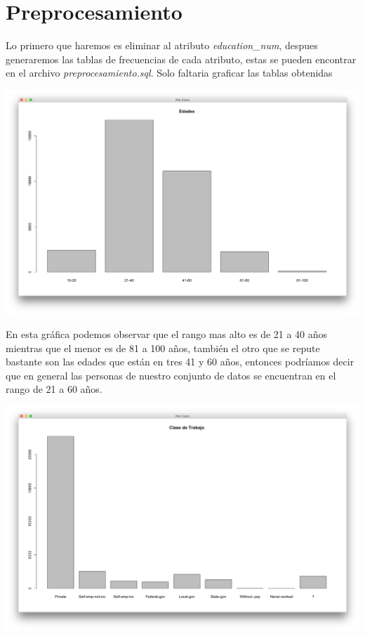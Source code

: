 \documentclass{article}
\begin{document}
\section{Preprocesamiento}
  Lo primero que haremos es eliminar al atributo {\it education\_num}, despues generaremos las tablas de frecuencias de cada atributo, estas se pueden encontrar en el archivo {\it preprocesamiento.sql}. Solo faltaria graficar las tablas obtenidas
  \begin{center}
    \hbox{\hspace{-5.5em}\includegraphics[scale=0.4]{graficas/edadesP}}
  \end{center}
  En esta gráfica podemos observar que el rango mas alto es de 21 a 40 años mientras que el menor es de 81 a 100 años, también el otro que se repute bastante son las edades que están en tres 41 y 60 años, entonces podríamos decir que en general las personas de nuestro conjunto de datos se encuentran en el rango de 21 a 60 años.
  \begin{center}
    \hbox{\hspace{-5.5em}\includegraphics[scale=0.4]{graficas/workclassP}}
  \end{center}
\end{document}
